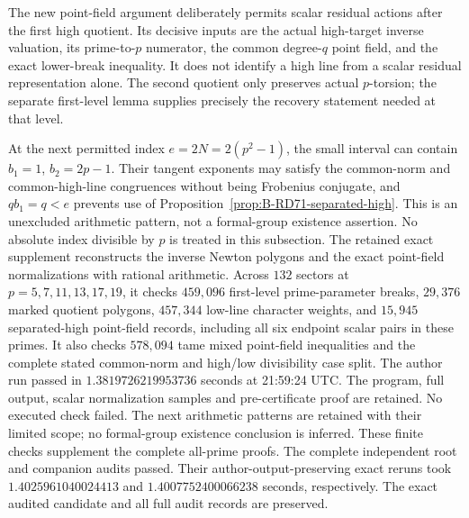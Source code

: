 \begin{remark}
\label{rem:B-RD71-scope}
The new point-field argument deliberately permits scalar
residual actions after the first high quotient.
Its decisive inputs are the actual high-target inverse
valuation, its prime-to-\(p\) numerator, the common degree-\(q\)
point field, and the exact lower-break inequality.
It does not identify a high line from a scalar residual
representation alone.
The second quotient only preserves actual \(p\)-torsion;
the separate first-level lemma supplies precisely the
recovery statement needed at that level.

At the next permitted index \(e=2N=2(p^2-1)\), the small
interval can contain \(b_1=1\), \(b_2=2p-1\).
Their tangent exponents may satisfy the common-norm and
common-high-line congruences without being Frobenius conjugate,
and \(q b_1=q<e\) prevents use of
Proposition~\ref{prop:B-RD71-separated-high}.
This is an unexcluded arithmetic pattern, not a formal-group
existence assertion. No absolute index divisible by \(p\)
is treated in this subsection.
The retained exact supplement
reconstructs the inverse Newton polygons and the exact
point-field normalizations with rational arithmetic.
Across \(132\) sectors at \(p=5,7,11,13,17,19\), it checks
\(459{,}096\) first-level prime-parameter breaks,
\(29{,}376\) marked quotient polygons,
\(457{,}344\) low-line character weights, and
\(15{,}945\) separated-high point-field records, including
all six endpoint scalar pairs in these primes.
It also checks \(578{,}094\) tame mixed point-field inequalities
and the complete stated common-norm and high/low divisibility
case split. The author run passed in
\(1.3819726219953736\) seconds at 21:59:24 UTC.
The program, full output, scalar normalization samples and
pre-certificate proof are retained. No executed check failed.
The next arithmetic patterns are retained with their limited
scope; no formal-group existence conclusion is inferred.
These finite checks supplement the complete all-prime proofs.
The complete independent root and companion audits passed.
Their author-output-preserving exact reruns took
\(1.4025961040024413\) and \(1.4007752400066238\) seconds,
respectively. The exact audited candidate and all full audit
records are preserved.
\end{remark}

